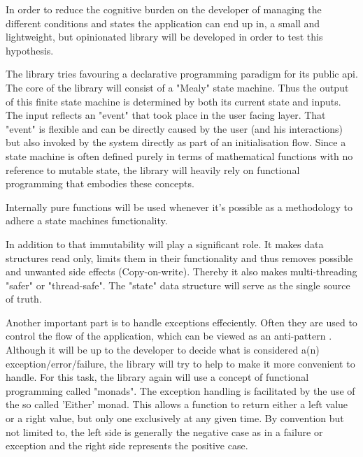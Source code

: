 




In order to reduce the cognitive burden on the developer of managing the different conditions and 
states the application can end up in, a small and lightweight, but opinionated library will be developed
in order to test this hypothesis.

The library tries favouring a declarative programming paradigm for its public api.
The core of the library will consist of a "Mealy" state machine. 
Thus the output of this finite state machine is determined by both its current state and inputs.
The input reflects an "event" that took place in the user facing layer.
That "event" is flexible and can be directly caused by the user (and his interactions) but also invoked
by the system directly as part of an initialisation flow. %
Since a state machine is often defined purely in terms of mathematical functions with no reference to mutable state, 
the library will heavily rely on functional programming that embodies these concepts.

Internally pure functions will be used whenever it's possible as a methodology to adhere a state machines functionality.

In addition to that immutability will play a significant role. It makes data structures read only, limits them in their functionality 
and thus removes possible and unwanted side effects (Copy-on-write). Thereby it also makes multi-threading "safer" or "thread-safe".
The "state" data structure will serve as the single source of truth.

Another important part is to handle exceptions effeciently. Often they are used to control the flow of
the application, which can be viewed as an anti-pattern \cite{dontUseExceptionsForFlowControl}.
Although it will be up to the developer to decide what is considered a(n) exception/error/failure, 
the library will try to help to make it more convenient to handle.
For this task, the library again will use a concept of functional programming called "monads".
The exception handling is facilitated by the use of the so called 'Either' monad.
This allows a function to return either a left value or a right value, but only one exclusively at
any given time. By convention but not limited to, the left side is generally the negative case as in a failure or exception
and the right side represents the positive case.

